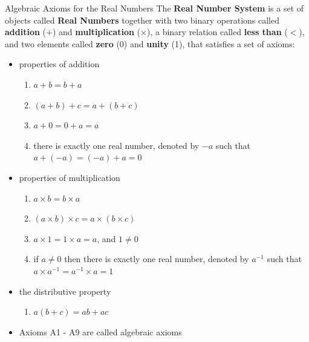 \documentclass[9pt,aspectratio=169]{beamer}
\begin{document}
\begin{frame}[allowframebreaks]{Algebraic Axioms for the Real Numbers}
    The \textbf{Real Number System} is a set of objects called \textbf{Real
      Numbers} together with two binary operations called \textbf{addition}
    ($+$) and \textbf{multiplication} ($\times$), a binary relation called
    \textbf{less than} ($<$), and two elements called \textbf{zero} (0) and
    \textbf{unity} (1), that satisfies a set of axioms:
    \begin{itemize}
        \item properties of addition
        \begin{enumerate}
            \item [A1] $a + b = b + a$
            \item [A2] $(a + b) + c = a + (b + c)$
            \item [A3] $a + 0 = 0 + a = a$
            \item [A4] there is exactly one real number, denoted by $-a$ such
            that $a + (-a) = (-a) + a = 0$
        \end{enumerate}
        \framebreak
        \item properties of multiplication
        \begin{enumerate}
            \item [A5] $a \times b = b \times a$
            \item [A6] $(a \times b) \times c = a \times (b \times c)$
            \item [A7] $a \times 1 = 1 \times a = a$, and $1 \neq 0$
            \item [A8] if $a \neq 0$ then there is exactly one real number,
            denoted by $a^{-1}$ such that $a \times a^{-1} = a^{-1} \times a = 1$
        \end{enumerate}
        \item the distributive property
        \begin{enumerate}
            \item [A9] $a(b+c) = ab + ac$
        \end{enumerate}
        \item Axioms A1 - A9 are called algebraic axioms
    \end{itemize}
\end{frame}
\end{document}
